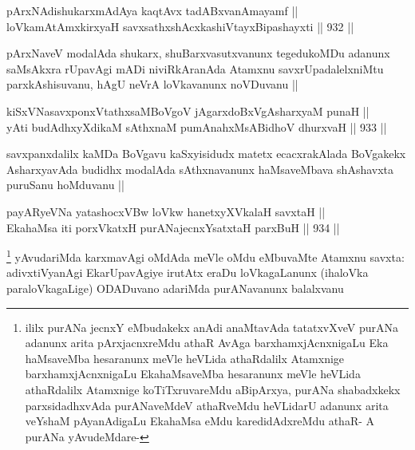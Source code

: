 \begin{shl}
pArxNAdishukarxmAdAya kaqtAvx tadABxvanAmayamf || \\
loVkamAtAmx\s kirxyaH savxsathxshAcxkashiVtayxBipashayxti ||  932 ||  
\end{shl}

\begin{artha}
pArxNaveV modalAda shukarx, shuBarxvasutxvanunx tegedukoMDu adanunx saMsAkxra rUpavAgi mADi niviRkAranAda Atamxnu savxrUpadalelxniMtu parxkAshisuvanu, hAgU neVrA loVkavanunx noVDuvanu ||
\end{artha}


\begin{shl}
kiSxVNasavxponxVtathxsaMBoVgoV jAgarxdoBxVgAsharxyaM punaH || \\
yAti budAdhxyXdikaM sAthxnaM pumAnahxMsABidhoV dhurxvaH ||  933 ||  
\end{shl}

\begin{artha}
savxpanxdalilx kaMDa BoVgavu kaSxyisidudx matetx ecacxrakAlada BoVgakekx AsharxyavAda budidhx modalAda sAthxnavanunx haMsaveMbava shAshavxta puruSanu hoMduvanu ||
\end{artha}


\begin{shl}
payARyeVNa yatashocxVBw loVkw hanetxyXVkalaH savxtaH || \\
EkahaMsa iti porxVkatxH purANajecnxYsatxtaH parxBuH ||  934 ||  
\end{shl}

\begin{artha}
\footnote{ililx purANa jecnxY eMbudakekx anAdi anaMtavAda tatatxvXveV purANa adanunx arita pArxjacnxreMdu athaR AvAga barxhamxjAcnxnigaLu Eka haMsaveMba hesaranunx meVle heVLida athaRdalilx Atamxnige barxhamxjAcnxnigaLu EkahaMsaveMba hesaranunx meVle heVLida athaRdalilx Atamxnige koTiTxruvareMdu aBipArxya, purANa shabadxkekx parxsidadhxvAda purANaveMdeV athaRveMdu heVLidarU adanunx arita veYshaM pAyanAdigaLu EkahaMsa eMdu karedidAdxreMdu athaR- A purANa yAvudeMdare- \stext}
yAvudariMda karxmavAgi oMdAda meVle oMdu eMbuvaMte Atamxnu savxta: adivxtiVyanAgi EkarUpavAgiye irutAtx eraDu loVkagaLanunx (ihaloVka paraloVkagaLige) ODADuvano adariMda purANavanunx balalxvanu
\end{artha}


